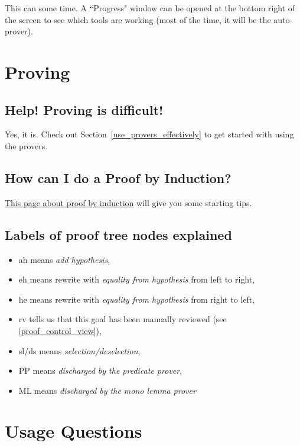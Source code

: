 This can some time. A ``Progress" window can be opened at the bottom right of the screen to see which tools are working (most of the time, it will be the auto-prover). 

\section{Proving}

\subsection{Help!  Proving is difficult!}

Yes, it is.  Check out Section~\ref{use_provers_effectively} to get started with using the provers.

\subsection{How can I do a Proof by Induction?}

\href{http://wiki.event-b.org/index.php/Induction_proof}{This page about proof by induction} will give you some starting tips.

\subsection{Labels of proof tree nodes explained}

\begin{itemize}
	\item \textsf{ah} means \textit{add hypothesis},
	\item \textsf{eh} means rewrite with \textit{equality from hypothesis} from left to right,
	\item \textsf{he} means rewrite with \textit{equality from hypothesis} from right to left,
	\item \textsf{rv} tells us that this goal has been manually reviewed (see \ref{proof_control_view}),
	\item \textsf{sl/ds} means \textit{selection/deselection},
	\item \textsf{PP} means \textit{discharged by the predicate prover},
	\item \textsf{ML} means \textit{discharged by the mono lemma prover}
\end{itemize}

\section{Usage Questions}

